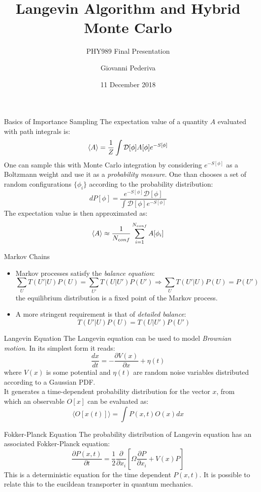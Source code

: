 \documentclass[10pt]{beamer}
\title{Langevin Algorithm and Hybrid Monte Carlo}
\subtitle{PHY989 Final Presentation}
\date{11 December 2018}
\author{Giovanni Pederiva}
\institute{Michigan State University}
\newcommand{\D}{\mathcal{D}}
\begin{document}
\maketitle

\begin{frame}{Basics of Importance Sampling}
The expectation value of a quantity $A$ evaluated with path integrals is:
\[
    \braket{A} = \frac{1}{Z}\int \D[\phi] A[\phi]e^{-S[\phi]}
\]
One can sample this with Monte Carlo integration by considering $e^{-S[\phi]}$ as a Boltzmann weight and use it as a \textit{probability measure}. One than chooses a set of random configurations  $\{\phi_i\}$ according to the probability distribution:
\[
    dP[\phi] = \frac{e^{-S[\phi]}\D[\phi]}{\int \D[\phi] e^{-S[\phi]}}
\]
The expectation value is then approximated as:
\[
    \braket{A} \approx \frac{1}{N_{conf}} \sum_{i=1}^{N_{conf}} A[\phi_i]
\]
\end{frame}

\begin{frame}{Markov Chains}
\begin{itemize}
\item Markov processes satisfy the \textit{balance equation}:
\[
    \sum_U T(U'|U)P(U) = \sum_{U'} T(U|U')P(U') \Rightarrow \sum_U T(U'|U)P(U) = P(U')
\]
the equilibrium distribution is a fixed point of the Markov process. 
\item A more stringent requirement is that of \textit{detailed balance}:
\[
    T(U'|U)P(U) = T(U|U')P(U')
\]
\end{itemize}
\end{frame}

\begin{frame}{Langevin Equation}
The Langevin equation can be used to model \textit{Brownian motion}. In its simplest form it reads:
\[
    \frac{dx}{dt} = -\frac{\partial V(x)}{\partial x} + \eta(t)
\]
where $V(x)$ is some potential and $\eta(t)$ are random noise variables distributed according to a Gaussian PDF. \\
It generates a time-dependent probability distribution for the vector $x$, from which an observable $O[x]$ can be evaluated as:
\[
 \langle O[x(t)] \rangle = \int P(x, t) O(x)dx
\]
\end{frame}

\begin{frame}{Fokker-Planck Equation}
The probability distribution of Langevin equation has an associated Fokker-Planck equation:
\[
    \frac{\partial P(x,t)}{\partial t} = \frac{1}{2} \frac{\partial}{\partial x_i}\left[ \Omega \frac{\partial P}{\partial x_i} + V(x)P\right]
\]
This is a deterministic equation for the time dependent $P(x,t)$. It is possible to relate this to the eucildean transporter in quantum mechanics.  
\end{frame}
\end{document}
